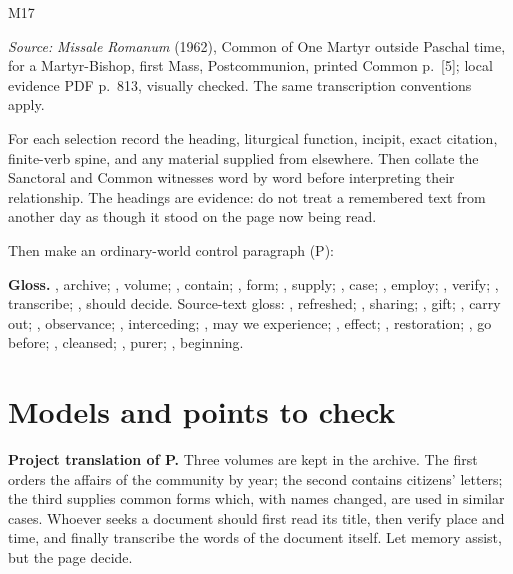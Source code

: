 \begin{courseunit}{M17}

\emph{Source:} \textit{Missale Romanum} (1962), Common of One Martyr outside
Paschal time, for a Martyr-Bishop, first Mass, Postcommunion, printed Common
p.~[5]; local evidence PDF p.~813, visually checked.  The same transcription
conventions apply.

For each selection record the heading, liturgical function, incipit, exact
citation, finite-verb spine, and any material supplied from elsewhere.  Then
collate the Sanctoral and Common witnesses word by word before interpreting
their relationship.  The headings are evidence: do not treat a remembered
text from another day as though it stood on the page now being read.

Then make an ordinary-world control paragraph (P):


\textbf{Gloss.} , archive; , volume;
, contain; , form; , supply;
, case; , employ; , verify;
, transcribe; , should decide.  Source-text
gloss: , refreshed; , sharing;
, gift; , carry out; , observance;
, interceding; , may we experience;
, effect; , restoration;
, go before; , cleansed;
, purer; , beginning.

\ifsolutions
\section{Models and points to check}
\textbf{Project translation of P.} Three volumes are kept in the archive. The
first orders the affairs of the community by year; the second contains
citizens' letters; the third supplies common forms which, with names changed,
are used in similar cases. Whoever seeks a document should first read its
title, then verify place and time, and finally transcribe the words of the
document itself. Let memory assist, but the page decide.


\end{courseunit}

